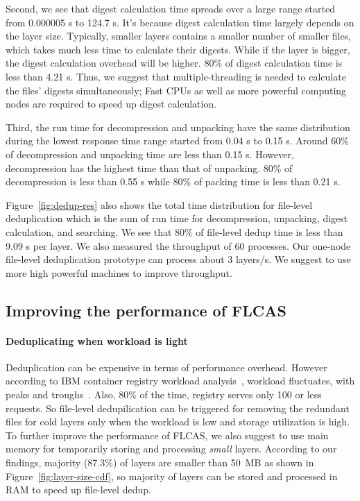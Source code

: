 Second, we see that digest calculation time spreads over a large range started
from 0.000005 s to 124.7 s. 
%
It's because digest calculation time largely
depends on the layer size. 
%
Typically, smaller layers contains a smaller number
of smaller files, which takes much less time to calculate their digests. 
%
While
if the layer is bigger, the digest calculation overhead will be higher. 
%
80\% of
digest calculation time is less than 4.21 s. 
%
Thus, we suggest that multiple-threading is needed to calculate the files'
digests simultaneously; 
%
Fast CPUs as well as more powerful computing nodes are
required to speed up digest calculation.

Third, the run time for decompression and unpacking have the same distribution
during the lowest response time range started from 0.04 s to 0.15 s. 
%
Around
60\% of decompression and unpacking time are less than 0.15 s. 
%
However,
decompression has the highest time than that of unpacking. 
%
80\% of
decompression is less than 0.55 s while 80\% of packing time is less than 0.21 s. 

Figure~\ref{fig:dedup-res} also shows the total time distribution for
file-level deduplication which is the sum of run time for decompression, unpacking,
digest calculation, and searching. 
%
We see that 80\% of file-level dedup time is
less than 9.09 s per layer.
%
%
We also measured the throughput of 60 processes. 
%
Our one-node file-level
deduplication prototype can process about 3 layers/s. 
%
We suggest to use more
high powerful machines to improve throughput.

 
%
\subsection{Improving the performance of FLCAS}
%
\paragraph{Deduplicating when workload is light}
Deduplication can be expensive in terms of performance overhead.
%
However according to IBM container registry workload analysis~\cite{dockerworkload},
workload fluctuates, with peaks and troughs~\cite{dockerworkload}.
%
Also, 80\% of the time, registry serves only 100 or less requests.
%
So file-level dedupilication can be triggered for removing the redundant files for cold
layers only when the workload is low and storage utilization is high.
%
To further improve the performance of FLCAS, we also suggest to use main memory
for temporarily storing and processing \textit{small} layers.
%
According to our findings, majority (87.3\%) of layers are smaller than 50~MB as shown in
Figure~\ref{fig:layer-size-cdf},  so majority of layers can be stored and
processed in RAM to speed up file-level dedup. 

